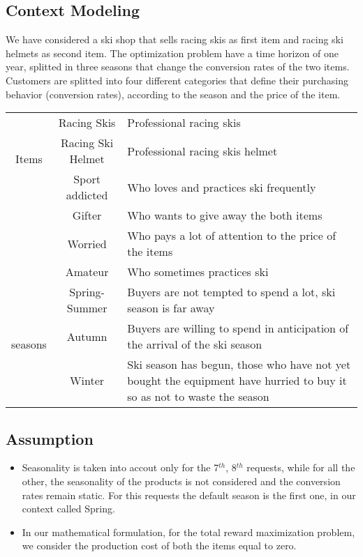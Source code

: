 \subsection*{Context Modeling}
We have considered a ski shop that sells racing skis as first item and racing ski helmets as second item. The optimization problem have a time horizon of one year, splitted in three seasons that change the conversion rates of the two items. Customers are splitted into four different categories that define their purchasing behavior (conversion rates), according to the season and the price of the item.

\begin{center}
	\begin{tabular}{ |c|c|p{9cm}| } 
	\hline
	\multirow{3}{4em}{Items} & Racing Skis & Professional racing skis \\ 
	& Racing Ski Helmet &  Professional racing skis helmet\\ 
	\hline
	\multirow{3}{4em}{Customer categories} & Sport addicted & Who loves and practices ski frequently\\ 
	& Gifter &  Who wants to give away the both items\\
	& Worried &  Who pays a lot of attention to the price of the items\\ 
	& Amateur &  Who sometimes practices ski\\ 
	\hline
	\multirow{3}{4em}{seasons} & Spring-Summer & Buyers are not tempted to spend a lot, ski season is far away\\ 
	& Autumn & Buyers are willing to spend in anticipation of the arrival of the ski season \\
	& Winter &  Ski season has begun, those who have not yet bought the equipment have hurried to buy it so as not to waste the season\\  
	\hline
	\end{tabular}
	\end{center}

\subsection*{Assumption}
\begin{itemize}
		\item Seasonality is taken into accout only for the 7$^{th}$, 8$^{th}$ requests, while for all the other, the seasonality of the products is not considered and the conversion rates remain static. For this requests the default season is the first one, in our context called Spring.  
		\item In our mathematical formulation, for the total reward maximization problem, we consider the production cost of both the items equal to zero.
\end{itemize}